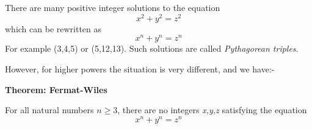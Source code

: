 \documentclass[a4paper]{article}
\begin{document}
\noindent There are many positive integer solutions to the equation
\[ x^2 + y^2 = z^2 \]
\noindent which can be rewritten as
\[ x^n + y^n = z^n \]
\noindent For example (3,4,5) or (5,12,13). Such solutions are called \emph{Pythagorean triples}.

\noindent However, for higher powers the situation is very different, and we have:-

\textbf{Theorem: Fermat-Wiles}

\noindent For all natural numbers \(n \geq 3\), there are no integers \emph{x,y,z} satisfying the equation
\[ x^n + y^n = z^n \]
\end{document}
